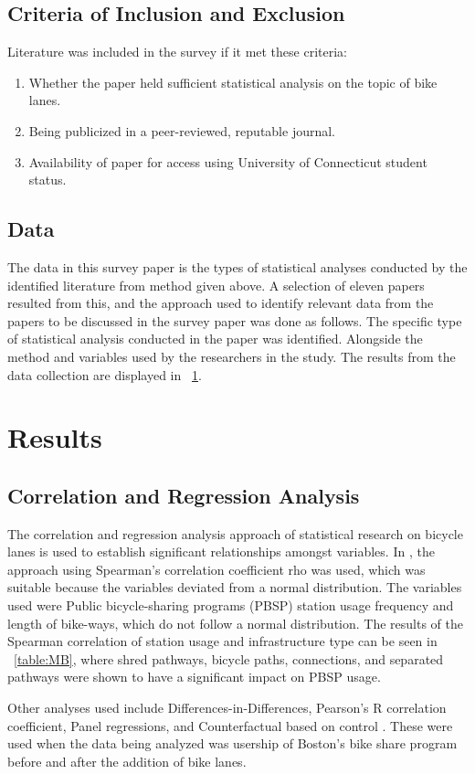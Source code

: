 \documentclass[12pt, letterpaper]{article}
\begin{document}
\subsection{Criteria of Inclusion and Exclusion}
\label{sec:inc}

Literature was included in the survey if it met these criteria:

\begin{enumerate}
        \item Whether the paper held sufficient statistical analysis on the topic of bike lanes. 
        \item Being publicized in a peer-reviewed, reputable journal.
        \item Availability of paper for access using University of Connecticut student status. 
\end{enumerate}

\subsection{Data}
\label{sec:data}

The data in this survey paper is the types of statistical analyses conducted by the identified literature from method given above. A selection of eleven papers resulted from this, and the approach used to identify relevant data from the papers to be discussed in the survey paper was done as follows. The specific type of statistical analysis conducted in the paper was identified. Alongside the method and variables used by the researchers in the study. The results from the data collection are displayed in ~\ref{sec:results}. 

\section{Results}
\label{sec:results}

\subsection{Correlation and Regression Analysis}
\label{sec:corr}

The correlation and regression analysis approach of statistical research on bicycle lanes is used to establish significant relationships amongst variables. In \citet{1MateoBabiano2016}, the approach using Spearman's correlation coefficient rho was used, which was suitable because the variables deviated from a normal distribution. The variables used were Public bicycle-sharing programs (PBSP) station usage frequency and length of bike-ways, which do not follow a normal distribution. The results of the Spearman correlation of station usage and infrastructure type can be seen in ~\ref{table:MB}, where shred pathways, bicycle paths, connections, and separated pathways were shown to have a significant impact on PBSP usage. \par
Other analyses used include Differences-in-Differences, Pearson's R correlation coefficient, Panel regressions, and Counterfactual based on control \cite{Karpinski2021}. These were used when the data being analyzed was usership of Boston's bike share program before and after the addition of bike lanes. 
\end{document}
